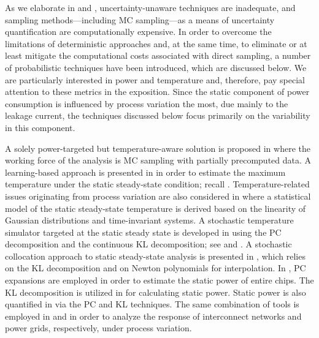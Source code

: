 As we elaborate in  and , uncertainty-unaware
techniques are inadequate, and sampling methods---including \ac{MC}
sampling---as a means of uncertainty quantification are computationally
expensive. In order to overcome the limitations of deterministic approaches and,
at the same time, to eliminate or at least mitigate the computational costs
associated with direct sampling, a number of probabilistic techniques have been
introduced, which are discussed below. We are particularly interested in power
and temperature and, therefore, pay special attention to these metrics in the
exposition. Since the static component of power consumption is influenced by
process variation the most, due mainly to the leakage current, the techniques
discussed below focus primarily on the variability in this component.

A solely power-targeted but temperature-aware solution is proposed in
\cite{chandra2010} where the working force of the analysis is \ac{MC} sampling
with partially precomputed data. A learning-based approach is presented in
\cite{juan2011} in order to estimate the maximum temperature under the static
steady-state condition; recall .
Temperature-related issues originating from process variation are also
considered in \cite{juan2012} where a statistical model of the static
steady-state temperature is derived based on the linearity of Gaussian
distributions and time-invariant systems. A stochastic temperature simulator
targeted at the static steady state is developed in \cite{huang2009a} using the
\ac{PC} decomposition and the continuous \ac{KL} decomposition; see
 and . A stochastic
collocation \cite{maitre2010, xiu2010} approach to static steady-state analysis
is presented in \cite{lee2013}, which relies on the \ac{KL} decomposition and on
Newton polynomials for interpolation. In \cite{shen2009}, \ac{PC} expansions are
employed in order to estimate the static power of entire chips. The \ac{KL}
decomposition is utilized in \cite{bhardwaj2006} for calculating static power.
Static power is also quantified in \cite{bhardwaj2008} via the \ac{PC} and
\ac{KL} techniques. The same combination of tools is employed in
\cite{vrudhula2006} and \cite{ghanta2006} in order to analyze the response of
interconnect networks and power grids, respectively, under process variation.

